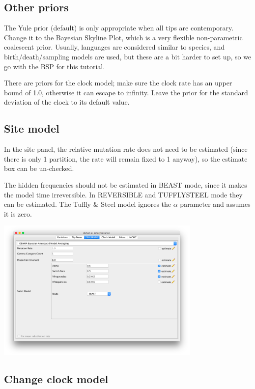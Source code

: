 \documentclass{article}
\begin{document}
\subsection*{Other priors}
The Yule prior (default) is only appropriate when all tips are contemporary.
Change it to the Bayesian Skyline Plot, which is a very flexible non-parametric coalescent prior. Usually, languages are considered similar to species, and birth/death/sampling models are used, but these are a bit harder to set up, so we go with the BSP for this tutorial.

There are priors for the clock model; make sure the clock rate has an upper bound of 1.0, otherwise it can escape to infinity.
Leave the prior for the standard deviation of the clock to its default value. 

\subsection*{Site model}
In the site panel, the relative mutation rate does not need to be estimated (since there is only 1 partition, the rate will remain fixed to 1 anyway), so the estimate box can be un-checked.

The hidden frequencies should not be estimated in BEAST mode, since it makes the model time irreversible. In REVERSIBLE and TUFFLYSTEEL mode they can be estimated. The Tuffly \& Steel model ignores the $\alpha$ parameter and assumes it is zero.

\begin{center}
\includegraphics[width=0.75\textwidth]{sitepanel}
\end{center}

\subsection*{Change clock model}
\end{document}
